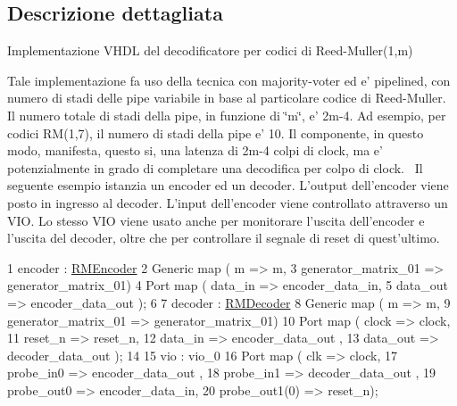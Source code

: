 \subsection{Descrizione dettagliata}
Implementazione V\+H\+D\+L del decodificatore per codici di Reed-\/\+Muller(1,m) 

Tale implementazione fa uso della tecnica con majority-\/voter ed e' pipelined, con numero di stadi delle pipe variabile in base al particolare codice di Reed-\/\+Muller. Il numero totale di stadi della pipe, in funzione di \char`\"{}m\char`\"{}, e' 2m-\/4. Ad esempio, per codici R\+M(1,7), il numero di stadi della pipe e' 10. Il componente, in questo modo, manifesta, questo si, una latenza di 2m-\/4 colpi di clock, ma e' potenzialmente in grado di completare una decodifica per colpo di clock.~\newline
 Il seguente esempio istanzia un encoder ed un decoder. L'output dell'encoder viene posto in ingresso al decoder. L'input dell'encoder viene controllato attraverso un V\+I\+O. Lo stesso V\+I\+O viene usato anche per monitorare l'uscita dell'encoder e l'uscita del decoder, oltre che per controllare il segnale di reset di quest'ultimo.


\begin{DoxyCode}
1 encoder : \hyperlink{class_r_m_encoder}{RMEncoder}
2     \textcolor{keywordflow}{Generic} \textcolor{keywordflow}{map} (   m                   => m,
3                     generator\_matrix\_01  => generator\_matrix\_01\textcolor{vhdlchar}{)}
4     \textcolor{keywordflow}{Port} \textcolor{keywordflow}{map} (      data\_in              => encoder\_data\_in,
5                     data\_out             => encoder\_data\_out \textcolor{vhdlchar}{)};
6 
7 decoder : \hyperlink{class_r_m_decoder}{RMDecoder}
8     \textcolor{keywordflow}{Generic} \textcolor{keywordflow}{map} (   m                   => m,
9                     generator\_matrix\_01  => generator\_matrix\_01\textcolor{vhdlchar}{)}
10     \textcolor{keywordflow}{Port} \textcolor{keywordflow}{map} (      clock                => clock,
11                     reset\_n              => reset\_n,
12                     data\_in              => encoder\_data\_out ,
13                     data\_out             => decoder\_data\_out \textcolor{vhdlchar}{)};
14 
15 vio : vio\_0
16     \textcolor{keywordflow}{Port} \textcolor{keywordflow}{map} (  clk              => clock,
17                 probe\_in0        => encoder\_data\_out ,
18                 probe\_in1        => decoder\_data\_out ,
19                 probe\_out0       => encoder\_data\_in,
20                 probe\_out1\textcolor{vhdlchar}{(}\textcolor{vhdllogic}{0}\textcolor{vhdlchar}{)}    => reset\_n\textcolor{vhdlchar}{)};
\end{DoxyCode}


